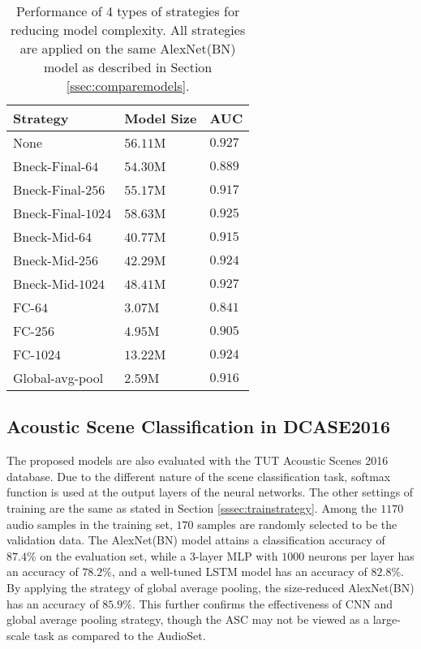 \documentclass{article}
\begin{document}
\begin{table}[]
\centering
\caption{Performance of 4 types of strategies for reducing model complexity. All strategies are applied on the same AlexNet(BN) model as described in Section \ref{ssec:comparemodels}.}
\label{dimreducedmodel}
\begin{tabular}{|l|l|l|}
\hline
Strategy           & Model Size           & AUC   \\ \hline
None               & $56.11$M               & $0.927$ \\ \hline
Bneck-Final-$64$   & $54.30$M               & $0.889$ \\ \hline
Bneck-Final-$256$  & $55.17$M               & $0.917$ \\ \hline
Bneck-Final-$1024$ & $58.63$M               & $0.925$ \\ \hline
Bneck-Mid-$64$     & $40.77$M               & $0.915$ \\ \hline
Bneck-Mid-$256$    & $42.29$M               & $0.924$ \\ \hline
Bneck-Mid-$1024$   & $48.41$M               & $0.927$ \\ \hline
FC-$64$            & $3.07$M                & $0.841$ \\ \hline
FC-$256$           & $4.95$M                & $0.905$ \\ \hline
FC-$1024$          & $13.22$M               & $0.924$ \\ \hline
Global-avg-pool    & $\mathbf{2.59}$M       & $0.916$ \\ \hline
\end{tabular}
\end{table}



\subsection{Acoustic Scene Classification in DCASE2016}
\label{ssec:ascresults}

The proposed models are also evaluated with the TUT Acoustic Scenes 2016 database. Due to the different nature of the scene classification task, softmax function is used at the output layers of the neural networks. The other settings of training are the same as stated in Section \ref{sssec:trainstrategy}. Among the $1170$ audio samples in the training set, $170$ samples are randomly selected to be the validation data. The AlexNet(BN) model attains a classification accuracy of $87.4\%$ on the evaluation set, while a $3$-layer MLP with $1000$ neurons per layer has an accuracy of $78.2\%$, and a well-tuned LSTM model has an accuracy of $82.8\%$. By applying the strategy of global average pooling, the size-reduced AlexNet(BN) has an accuracy of $85.9\%$. This further confirms the effectiveness of CNN and global average pooling strategy, though the ASC may not be viewed as a large-scale task as compared to the AudioSet.
\end{document}
